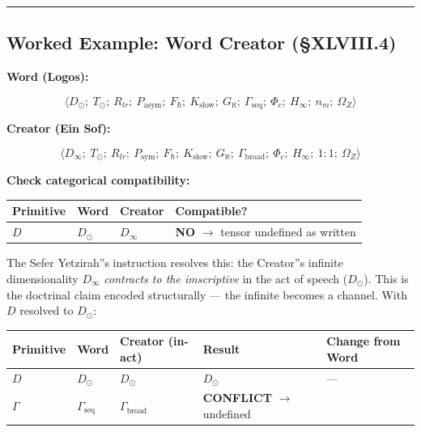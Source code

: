\documentclass[12pt,a4paper]{article}
\newcommand{\pilcrow}{\S}
\begin{document}
\begin{center}
\rule{0.5\textwidth}{0.4pt}
\end{center}

\subsection{Worked Example: Word \otimes Creator (\pilcrow{}XLVIII.4)}

\textbf{Word (Logos):}


\[\langle D_\odot;\ T_\odot;\ R_{lr};\ P_\text{asym};\ F_{\hbar};\ K_\text{slow};\ G_{\aleph};\ \Gamma_\text{seq};\ \Phi_c;\ H_{\infty};\ n_m;\ \Omega_Z \rangle\]

\textbf{Creator (Ein Sof):}


\[\langle D_{\infty};\ T_\odot;\ R_{lr};\ P_\text{sym};\ F_{\hbar};\ K_\text{slow};\ G_{\aleph};\ \Gamma_\text{broad};\ \Phi_c;\ H_{\infty};\ 1:1;\ \Omega_Z \rangle\]

\textbf{Check categorical compatibility:}

\begin{table}[htbp]
\centering
\small
{}
\begin{tabularx}{\textwidth}{>{\centering\arraybackslash}X >{\centering\arraybackslash}X >{\centering\arraybackslash}X >{\centering\arraybackslash}X}
\toprule
\rowcolor{gray!25}\textbf{Primitive} & \textbf{Word} & \textbf{Creator} & \textbf{Compatible?} \\
\midrule
\rowcolors{1}{white}{gray!10}
$D$ & $D_\odot$ & $D_{\infty}$ & \textbf{NO} $\rightarrow$ tensor undefined as written \\
\bottomrule
\end{tabularx}
\end{table}

The Sefer Yetzirah''s instruction resolves this: the Creator''s infinite dimensionality $D_{\infty}$ \emph{contracts to the imscriptive} in the act of speech ($D_\odot$). This is the doctrinal claim encoded structurally --- the infinite becomes a channel. With $D$ resolved to $D_\odot$:

\begin{table}[htbp]
\centering
\small
{}
\begin{tabularx}{\textwidth}{>{\centering\arraybackslash}X >{\centering\arraybackslash}X >{\centering\arraybackslash}X >{\centering\arraybackslash}X >{\centering\arraybackslash}X}
\toprule
\rowcolor{gray!25}\textbf{Primitive} & \textbf{Word} & \textbf{Creator (in-act)} & \textbf{Result} & \textbf{Change from Word} \\
\midrule
\rowcolors{1}{white}{gray!10}
$D$ & $D_\odot$ & $D_\odot$ & $D_\odot$ & --- \\
$\Gamma$ & $\Gamma_\text{seq}$ & $\Gamma_\text{broad}$ & \textbf{CONFLICT} $\rightarrow$ undefined &  \\
\bottomrule
\end{tabularx}
\end{table}
\end{document}
